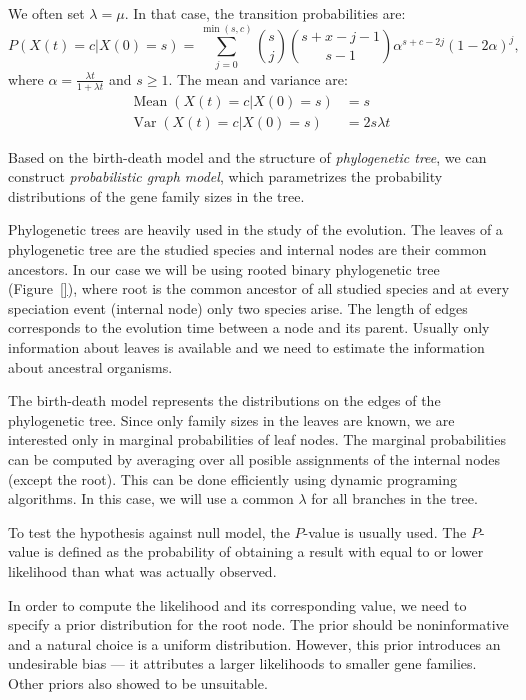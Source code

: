 We often set $\lambda = \mu$. In that case, the transition probabilities are\cite{hahn2005estimating}:
$$P(X(t) = c | X(0) = s) = \sum_{j=0}^{\min(s, c)} {s \choose j}{s+x-j-1 \choose s-1}\alpha^{s+c-2j}{(1-2\alpha)}^j,$$
where $\alpha = \frac{\lambda t}{1+ \lambda t}$ and $s \geq 1$. The mean and variance are\cite{hahn2005estimating}:
\begin{align*}
  \operatorname{Mean}(X(t) = c | X(0) = s) &= s\\
  \operatorname{Var}(X(t) = c | X(0) = s) &= 2s\lambda t
\end{align*}

Based on the birth-death model and the structure of \emph{phylogenetic tree}, we can construct \emph{probabilistic graph model}, which parametrizes the probability distributions of the gene family sizes in the tree.

Phylogenetic trees are heavily used in the study of the evolution. The leaves of a phylogenetic tree are the studied species and internal nodes are their common ancestors. In our case we will be using rooted binary phylogenetic tree (Figure~\ref{}), where root is the common ancestor of all studied species and at every speciation event (internal node) only two species arise. The length of edges corresponds to the evolution time between a node and its parent. Usually only information about leaves is available and we need to estimate the information about ancestral organisms.

The birth-death model represents the distributions on the edges of the phylogenetic tree. Since only family sizes in the leaves are known, we are interested only in marginal probabilities of leaf nodes. The marginal probabilities can be computed by averaging over all posible assignments of the internal nodes (except the root). This can be done efficiently using dynamic programing algorithms\cite{felsenstein1981evolutionary}. In this case, we will use a common $\lambda$ for all branches in the tree.

To test the hypothesis against null model, the $P$-value is usually used. The $P$-value is defined as the probability of obtaining a result with equal to or lower likelihood than what was actually observed.

In order to compute the likelihood and its corresponding value, we need to specify a prior distribution for the root node. The prior should be noninformative and a natural choice is a uniform distribution\cite{felsenstein1981evolutionary}. However, this prior introduces an undesirable bias --- it attributes a larger likelihoods to smaller gene families\cite{hahn2005estimating}. Other priors also showed to be unsuitable\cite{hahn2005estimating}.

